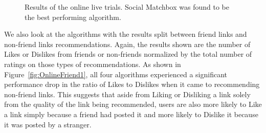 \begin{figure}[h!]
\centering
{}
\caption{Results of the online live trials. Social Matchbox was found to be the best performing algorithm.}
\label{fig:OnlineResult1}
\end{figure}

We also look at the algorithms with the results split between friend links and non-friend links recommendations. Again, the results shown are the number of Likes or Dislikes from friends or non-friends normalized by the total number of ratings on those types of recommendations. As shown in Figure~\ref{fig:OnlineFriend1}, all four algorithms experienced a significant performance drop in the ratio of Likes to Dislikes when it came to recommending non-friend links. This suggests that aside from Liking or Disliking a link solely from the quality of the link being recommended, users are also more likely to Like a link simply because a friend had posted it and more likely to Dislike it because it was posted by a stranger.

